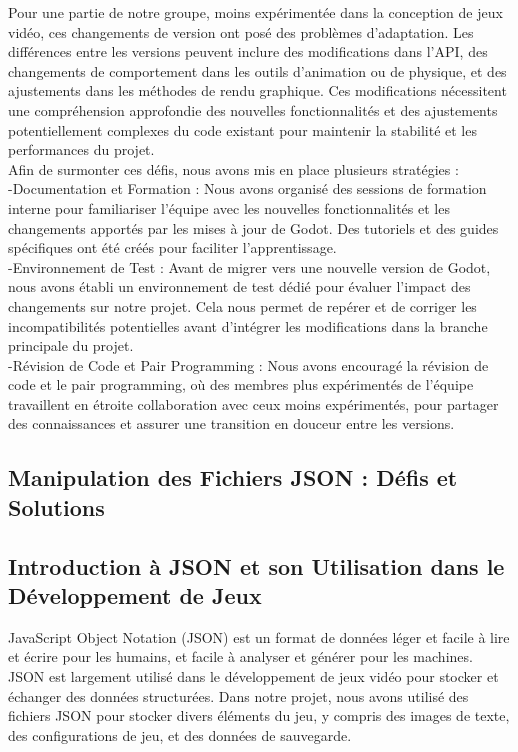 Pour une partie de notre groupe, moins expérimentée dans la conception de jeux vidéo, ces changements de version ont posé des problèmes d'adaptation.
 Les différences entre les versions peuvent inclure des modifications dans l'API, des changements de comportement dans les outils d'animation ou de physique, 
 et des ajustements dans les méthodes de rendu graphique. Ces modifications nécessitent une compréhension approfondie des nouvelles fonctionnalités et des 
 ajustements potentiellement complexes du code existant pour maintenir la stabilité et les performances du projet.
\\

Afin de surmonter ces défis, nous avons mis en place plusieurs stratégies :
\\

-Documentation et Formation : Nous avons organisé des sessions de formation interne pour familiariser l'équipe avec les nouvelles fonctionnalités 
et les changements apportés par les mises à jour de Godot. Des tutoriels et des guides spécifiques ont été créés pour faciliter l'apprentissage.
\\


-Environnement de Test : Avant de migrer vers une nouvelle version de Godot, nous avons établi un environnement de test dédié pour évaluer l'impact 
des changements sur notre projet. Cela nous permet de repérer et de corriger les incompatibilités potentielles avant d'intégrer les modifications dans la branche principale du projet.
\\

-Révision de Code et Pair Programming : Nous avons encouragé la révision de code et le pair programming, où des membres plus expérimentés de l'équipe 
travaillent en étroite collaboration avec ceux moins expérimentés, pour partager des connaissances et assurer une transition en douceur entre les versions.

\subsection{Manipulation des Fichiers JSON : Défis et Solutions}

\subsection*{Introduction à JSON et son Utilisation dans le Développement de Jeux}
JavaScript Object Notation (JSON) est un format de données léger et facile à lire et écrire pour les humains, et facile à analyser et générer pour les machines. 
JSON est largement utilisé dans le développement de jeux vidéo pour stocker et échanger des données structurées. Dans notre projet, nous avons utilisé des fichiers 
JSON pour stocker divers éléments du jeu, y compris des images de texte, des configurations de jeu, et des données de sauvegarde.
\\

